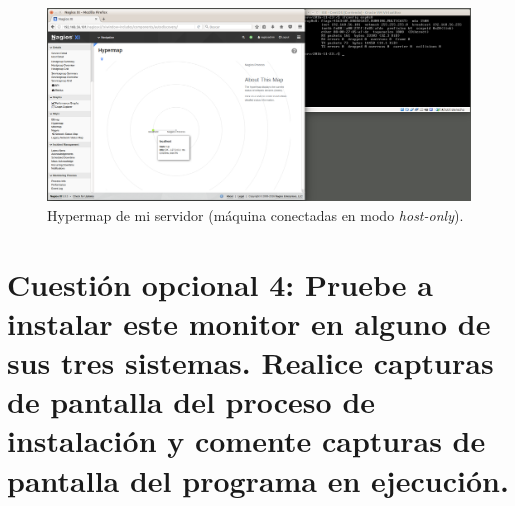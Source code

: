 \documentclass[a4paper,titlepage,12pt]{report}	%
\numberwithin{figure}{section} %
\numberwithin{table}{section} %
\begin{document}
	\begin{figure}[H]
	   \includegraphics[width=\linewidth]{./Imagenes/P3/O2-hypermap.png}
	   \vspace{-0.5cm}
	   \caption[Hypermap de mi servidor (máquina conectadas en modo \textit{host-only}).]{Hypermap de mi servidor  (máquina conectadas en modo \textit{host-only}).}
	   \label{P3-O2-hypermap}
	\end{figure}

	\section[Cuestión opcional 4: Pruebe a instalar este monitor en alguno de sus tres sistemas. Realice capturas de pantalla del proceso de instalación y comente capturas de pantalla del programa en ejecución.]{Cuestión opcional 4: Pruebe a instalar este monitor en alguno de sus tres sistemas. Realice capturas de pantalla del proceso de instalación y comente capturas de pantalla del programa en ejecución.}
\end{document}
